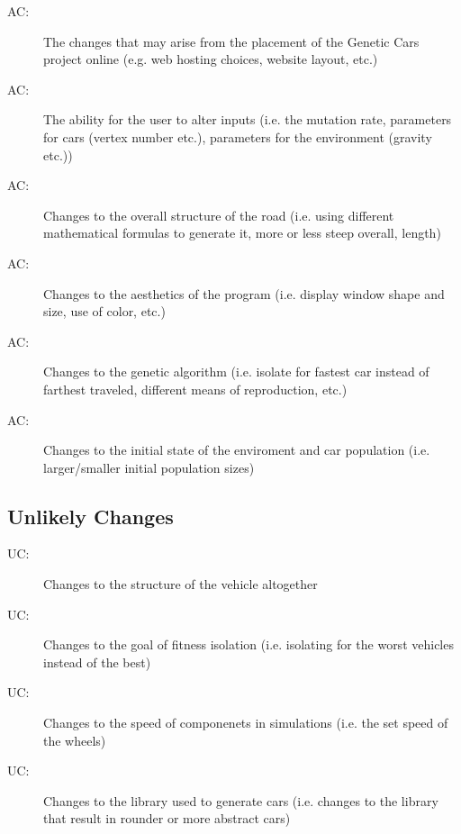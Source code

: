\documentclass[12pt, titlepage]{article}
\newcounter{acnum}
\newcommand{\actheacnum}{AC\theacnum}
\newcounter{ucnum}
\newcommand{\uctheucnum}{UC\theucnum}
\begin{document}
\begin{description}
\item[ \actheacnum \label{acWebsite}:] The changes that 
may arise  from the placement of the Genetic Cars project online (e.g. web 
hosting choices, website layout, etc.) 
\item[ \actheacnum \label{acUserInput}:] The ability for 
the user to alter inputs (i.e. the mutation rate, parameters for cars (vertex 
number etc.), parameters for the environment (gravity etc.)) 
\item[ \actheacnum \label{acRoad}:] Changes to the overall 
structure of the road (i.e. using different mathematical formulas to generate 
it, more or less steep overall, length) 
\item[ \actheacnum \label{acAesthetics}:] Changes to the 
aesthetics of the program (i.e. display window shape and size, use of color, 
etc.)
\item[ \actheacnum \label{acGeneticAlgorithm}:] Changes to 
the genetic algorithm (i.e. isolate for fastest car instead of farthest 
traveled, different means of reproduction, etc.)
\item[ \actheacnum \label{acInitialFactors}:] Changes to 
the initial state of the enviroment and car population (i.e. larger/smaller 
initial population sizes)
\end{description}

\subsection{Unlikely Changes} \label{SecUchange}

\begin{description}
\item[ \uctheucnum \label{ucVehicleChange}:] Changes to 
the structure of the vehicle altogether 
\item[ \uctheucnum \label{ucFitnessRequirements}:] Changes 
to the goal of fitness isolation (i.e. isolating for the worst vehicles instead 
of the best)
\item[ \uctheucnum \label{ucCarSpeed}:] Changes to the 
speed of componenets in simulations (i.e. the set speed of the wheels)
\item[ \uctheucnum \label{ucLibrary}:] Changes to the 
library used to generate cars (i.e. changes to the library that result in 
rounder or more abstract cars)
\end{description}
\end{document}
